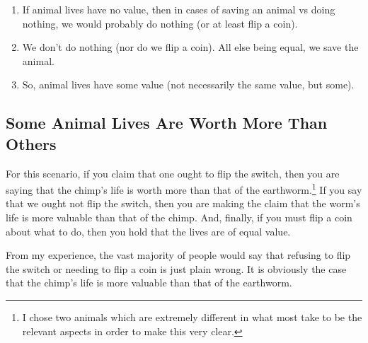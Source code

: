 \begin{enumerate}
    \item If animal lives have no value, then in cases of saving an animal vs doing nothing, we would probably do nothing (or at least flip a coin).
    \item We don’t do nothing (nor do we flip a coin). All else being equal, we save the animal.
    \item So, animal lives have some value (not necessarily the same value, but some).
\end{enumerate}

\subsection{Some Animal Lives Are Worth More Than Others}


For this scenario, if you claim that one ought to flip the switch, then you are saying that the chimp's life is worth more than that of the earthworm.\footnote{I chose two animals which are extremely different in what most take to be the relevant aspects in order to make this very clear.} If you say that we ought not flip the switch, then you are making the claim that the worm's life is more valuable than that of the chimp. And, finally, if you must flip a coin about what to do, then you hold that the lives are of equal value.

From my experience, the vast majority of people would say that refusing to flip the switch or needing to flip a coin is just plain wrong. It is obviously the case that the chimp's life is more valuable than that of the earthworm.


